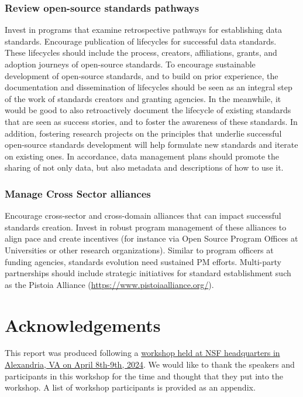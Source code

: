 \documentclass[
  number]{elsarticle}
\begin{document}
\subsubsection{Review open-source standards
pathways}\label{review-open-source-standards-pathways}

Invest in programs that examine retrospective pathways for establishing
data standards. Encourage publication of lifecycles for successful data
standards. These lifecycles should include the process, creators,
affiliations, grants, and adoption journeys of open-source standards. To
encourage sustainable development of open-source standards, and to build
on prior experience, the documentation and dissemination of lifecycles
should be seen as an integral step of the work of standards creators and
granting agencies. In the meanwhile, it would be good to also
retroactively document the lifecycle of existing standards that are seen
as success stories, and to foster the awareness of these standards. In
addition, fostering research projects on the principles that underlie
successful open-source standards development will help formulate new
standards and iterate on existing ones. In accordance, data management
plans should promote the sharing of not only data, but also metadata and
descriptions of how to use it.

\subsubsection{Manage Cross Sector
alliances}\label{manage-cross-sector-alliances}

Encourage cross-sector and cross-domain alliances that can impact
successful standards creation. Invest in robust program management of
these alliances to align pace and create incentives (for instance via
Open Source Program Offices at Universities or other research
organizations). Similar to program officers at funding agencies,
standards evolution need sustained PM efforts. Multi-party partnerships
should include strategic initiatives for standard establishment such as
the Pistoia Alliance (\url{https://www.pistoiaalliance.org/}).

\section{Acknowledgements}\label{acknowledgements}

This report was produced following a
\href{https://uwescience.github.io/2024-open-source-standards-workshop/}{workshop
held at NSF headquarters in Alexandria, VA on April 8th-9th, 2024}. We
would like to thank the speakers and participants in this workshop for
the time and thought that they put into the workshop. A list of workshop
participants is provided as an appendix.
\end{document}
